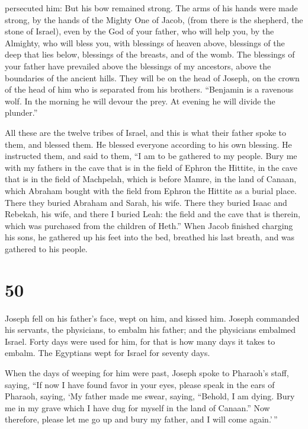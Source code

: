 persecuted him:  But his bow remained strong. The arms of
his hands were made strong, by the hands of the Mighty One of Jacob,
(from there is the shepherd, the stone of Israel),  even by
the God of your father, who will help you, by the Almighty, who will
bless you, with blessings of heaven above, blessings of the deep that
lies below, blessings of the breasts, and of the womb.  The
blessings of your father have prevailed above the blessings of my
ancestors, above the boundaries of the ancient hills. They will be on
the head of Joseph, on the crown of the head of him who is separated
from his brothers.  ``Benjamin is a ravenous wolf. In the
morning he will devour the prey. At evening he will divide the
plunder.''

 All these are the twelve tribes of Israel, and this is
what their father spoke to them, and blessed them. He blessed everyone
according to his own blessing.  He instructed them, and
said to them, ``I am to be gathered to my people. Bury me with my
fathers in the cave that is in the field of Ephron the Hittite,
 in the cave that is in the field of Machpelah, which is
before Mamre, in the land of Canaan, which Abraham bought with the field
from Ephron the Hittite as a burial place.  There they
buried Abraham and Sarah, his wife. There they buried Isaac and Rebekah,
his wife, and there I buried Leah:  the field and the cave
that is therein, which was purchased from the children of Heth.''
 When Jacob finished charging his sons, he gathered up his
feet into the bed, breathed his last breath, and was gathered to his
people.

\hypertarget{section-49}{%
\section{50}\label{section-49}}

 Joseph fell on his father's face, wept on him, and kissed
him.  Joseph commanded his servants, the physicians, to
embalm his father; and the physicians embalmed Israel. 
Forty days were used for him, for that is how many days it takes to
embalm. The Egyptians wept for Israel for seventy days.

 When the days of weeping for him were past, Joseph spoke to
Pharaoh's staff, saying, ``If now I have found favor in your eyes,
please speak in the ears of Pharaoh, saying,  `My father
made me swear, saying, ``Behold, I am dying. Bury me in my grave which I
have dug for myself in the land of Canaan.'' Now therefore, please let
me go up and bury my father, and I will come again.'\,''

